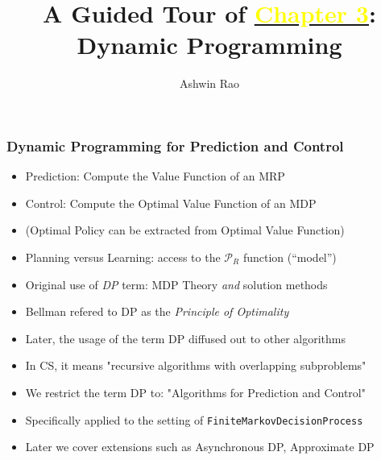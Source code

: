 \documentclass[handout]{beamer}
\title[Dynamic Programming Chapter]{A Guided Tour of \href{http://stanford.edu/~ashlearn/RLForFinanceBook/book.pdf}{\underline{\textcolor{yellow}{Chapter 3}}}: \\  Dynamic Programming} %
\author{Ashwin Rao} %
\institute[Stanford] %
{ICME, Stanford University
}
\date %
\begin{document}
\lstset{language=Python}  
\begin{frame}
\titlepage %
\end{frame}


\begin{frame}
\frametitle{Dynamic Programming for Prediction and Control}
\pause
\begin{itemize}[<+->]
\item Prediction: Compute the Value Function of an MRP
\item Control: Compute the Optimal Value Function of an MDP
\item (Optimal Policy can be extracted from Optimal Value Function)
\item Planning versus Learning: access to the $\mathcal{P}_R$ function (``model'')
\item Original use of {\em DP} term: MDP Theory {\em and} solution methods
\item Bellman refered to DP as the {\em Principle of Optimality}
\item Later, the usage of the term DP diffused out to other algorithms
\item In CS, it means "recursive algorithms with overlapping subproblems"
\item We restrict the term DP to: "Algorithms for Prediction and Control"
\item Specifically applied to the setting of \lstinline{FiniteMarkovDecisionProcess}
\item Later we cover extensions such as Asynchronous DP, Approximate DP
\end{itemize}
\end{frame}
\end{document}
